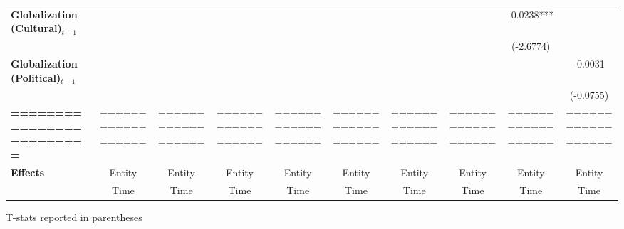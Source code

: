 \begin{center}
\begin{tabular}{lccccccccc}
\textbf{Globalization (Cultural)$_{t-1}$}             &                    &                    &                    &                    &                    &                    &                    &     -0.0238***     &                     \\
\textbf{ }                         &                    &                    &                    &                    &                    &                    &                    &     (-2.6774)      &                     \\
\textbf{Globalization (Political)$_{t-1}$}             &                    &                    &                    &                    &                    &                    &                    &                    &      -0.0031        \\
\textbf{ }                         &                    &                    &                    &                    &                    &                    &                    &                    &     (-0.0755)       \\
\textbf{=========================} & ================== & ================== & ================== & ================== & ================== & ================== & ================== & ================== & ==================  \\
\textbf{Effects}                   &       Entity       &       Entity       &       Entity       &       Entity       &       Entity       &       Entity       &       Entity       &       Entity       &       Entity        \\
\textbf{}                          &        Time        &        Time        &        Time        &        Time        &        Time        &        Time        &        Time        &        Time        &        Time         \\
\bottomrule
\end{tabular}
\end{center}

T-stats reported in parentheses